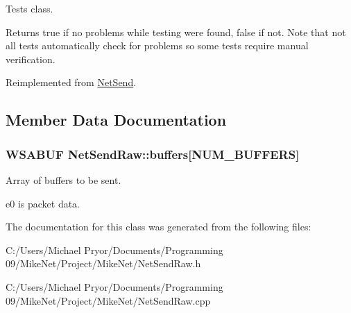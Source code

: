 Tests class. 

\begin{DoxyReturn}{Returns}
true if no problems while testing were found, false if not. Note that not all tests automatically check for problems so some tests require manual verification. 
\end{DoxyReturn}


Reimplemented from \hyperlink{class_net_send_ab93dd370f3117ed82eec3993ba0be71d}{NetSend}.



\subsection{Member Data Documentation}
\hypertarget{class_net_send_raw_a65c08b77ebbf2d2e6825d72a55fd5a67}{
\subsubsection[{buffers}]{\setlength{\rightskip}{0pt plus 5cm}WSABUF {\bf NetSendRaw::buffers}\mbox{[}{\bf NUM\_\-BUFFERS}\mbox{]}}}
\label{class_net_send_raw_a65c08b77ebbf2d2e6825d72a55fd5a67}


Array of buffers to be sent. 


\begin{DoxyItemize}
\item e0 is packet data. 
\end{DoxyItemize}

The documentation for this class was generated from the following files:\begin{DoxyCompactItemize}
\item 
C:/Users/Michael Pryor/Documents/Programming 09/MikeNet/Project/MikeNet/NetSendRaw.h\item 
C:/Users/Michael Pryor/Documents/Programming 09/MikeNet/Project/MikeNet/NetSendRaw.cpp\end{DoxyCompactItemize}
